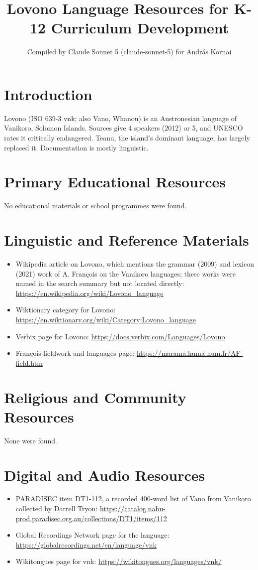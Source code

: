 \documentclass[12pt]{article}
\title{Lovono Language Resources for K-12 Curriculum Development}
\author{Compiled by Claude Sonnet 5 (claude-sonnet-5) for Andr\'as Kornai}
\date{}
\begin{document}
\maketitle

\section{Introduction}
Lovono (ISO 639-3 vnk; also Vano, Whanou) is an Austronesian language of Vanikoro, Solomon Islands. Sources give 4 speakers (2012) or 5, and UNESCO rates it critically endangered. Teanu, the island's dominant language, has largely replaced it. Documentation is mostly linguistic.

\section{Primary Educational Resources}
No educational materials or school programmes were found.

\section{Linguistic and Reference Materials}
\begin{itemize}
\item Wikipedia article on Lovono, which mentions the grammar (2009) and lexicon (2021) work of A. Fran\c{c}ois on the Vanikoro languages; these works were named in the search summary but not located directly: \url{https://en.wikipedia.org/wiki/Lovono_language}
\item Wiktionary category for Lovono: \url{https://en.wiktionary.org/wiki/Category:Lovono_language}
\item Verbix page for Lovono: \url{https://docs.verbix.com/Languages/Lovono}
\item Fran\c{c}ois fieldwork and languages page: \url{https://marama.huma-num.fr/AF-field.htm}
\end{itemize}

\section{Religious and Community Resources}
None were found.

\section{Digital and Audio Resources}
\begin{itemize}
\item PARADISEC item DT1-112, a recorded 400-word list of Vano from Vanikoro collected by Darrell Tryon: \url{https://catalog.nabu-prod.paradisec.org.au/collections/DT1/items/112}
\item Global Recordings Network page for the language: \url{https://globalrecordings.net/en/language/vnk}
\item Wikitongues page for vnk: \url{https://wikitongues.org/languages/vnk/}
\end{itemize}
\end{document}
